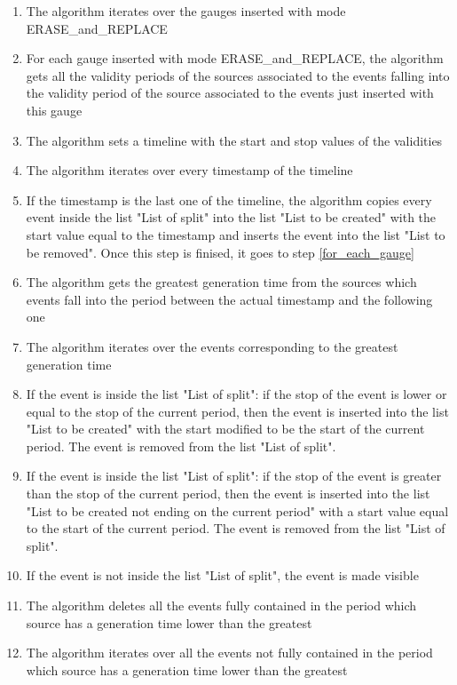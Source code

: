 \begin{enumerate}

\item The algorithm iterates over the gauges inserted with mode ERASE\_and\_REPLACE
\item \label{for_each_gauge} For each gauge inserted with mode ERASE\_and\_REPLACE, the algorithm gets all the validity periods of the sources associated to the events falling into the validity period of the source associated to the events just inserted with this gauge
\item The algorithm sets a timeline with the start and stop values of the validities
\item The algorithm iterates over every timestamp of the timeline
\item If the timestamp is the last one of the timeline, the algorithm copies every event inside the list "List of split" into the list "List to be created" with the start value equal to the timestamp and inserts the event into the list "List to be removed". Once this step is finised, it goes to step \ref{for_each_gauge}
\item The algorithm gets the greatest generation time from the sources which events fall into the period between the actual timestamp and the following one
\item The algorithm iterates over the events corresponding to the greatest generation time
\item If the event is inside the list "List of split": if the stop of the event is lower or equal to the stop of the current period, then the event is inserted into the list "List to be created" with the start modified to be the start of the current period. The event is removed from the list "List of split".
\item If the event is inside the list "List of split": if the stop of the event is greater than the stop of the current period, then the event is inserted into the list "List to be created not ending on the current period" with a start value equal to the start of the current period. The event is removed from the list "List of split".
\item If the event is not inside the list "List of split", the event is made visible
\item The algorithm deletes all the events fully contained in the period which source has a generation time lower than the greatest
\item The algorithm iterates over all the events not fully contained in the period which source has a generation time lower than the greatest

\end{enumerate}
